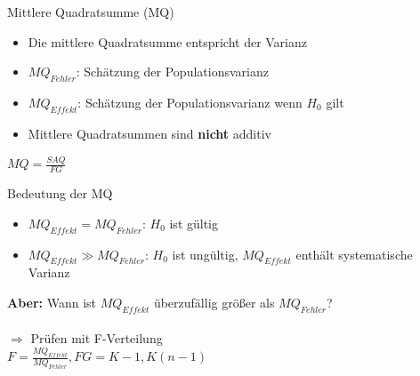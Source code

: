 \documentclass{beamer}
\begin{document}
	\begin{frame}{Mittlere Quadratsumme (MQ)}
		\begin{itemize}\itemsep=2ex
			\item Die mittlere Quadratsumme entspricht der Varianz
			\item $MQ_{Fehler}$: Schätzung der Populationsvarianz
			\item $MQ_{Effekt}$: Schätzung der Populationsvarianz wenn $H_0$ gilt
			\item Mittlere Quadratsummen sind \textbf{nicht} additiv
		\end{itemize}
		\begin{center}
			$MQ = \frac{SAQ}{FG}$
		\end{center}
	\end{frame}
	
	\begin{frame}{Bedeutung der MQ}
		\begin{itemize}\itemsep=2ex
			\item $MQ_{Effekt} = MQ_{Fehler}$: $H_0$ ist gültig
			\item $MQ_{Effekt} \gg MQ_{Fehler}$: $H_0$ ist ungültig, $MQ_{Effekt}$ enthält systematische Varianz
		\end{itemize}
		\begin{center}
			\textbf{Aber:} Wann ist $MQ_{Effekt}$ überzufällig größer als $MQ_{Fehler}$?
			\pause\\ \hfill\\ $\Rightarrow$ Prüfen mit F-Verteilung \vspace{2ex} \\
			$F = \frac{MQ_{Effekt}}{MQ_{Fehler}}, FG=K-1,K(n-1)$
		\end{center}
		
	\end{frame}
	
\end{document}
